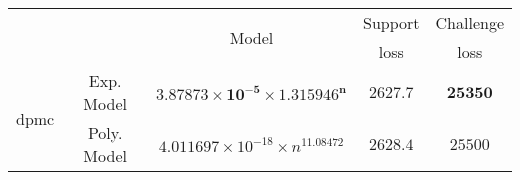 \begin{tabular}{ccccc} 
\hline 
 &  & \multirow{2}{*}{Model} & Support & Challenge\tabularnewline 
 &  &  & loss  & loss\tabularnewline 
\hline 
\hline 
\multirow{2}{*}{dpmc} & Exp. Model & $\mathbf{3.87873\times10^{-5}\times 1.315946^{n}}$ & $\mathbf{2627.7}$ & $\mathbf{25350}$ \tabularnewline 
 & Poly. Model & $4.011697\times10^{-18}\times n^{11.08472}$ & $2628.4$ & $25500$ \tabularnewline 
\hline 
\end{tabular} 

